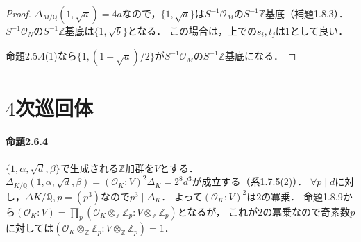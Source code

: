 \begin{proof}
  $\varDelta_{M/\mathbb{Q}}(1, \sqrt{a})=4a$なので，$\{1, \sqrt{a}\}$は$S^{-1}\mathcal{O}_M$の$S^{-1}\mathbb{Z}$基底（補題1.8.3）．
  $S^{-1}\mathcal{O}_N$の$S^{-1}\mathbb{Z}$基底は$\{1, \sqrt{b}\}$となる．
  この場合は，上での$s_i, t_j$は$1$として良い．

  命題2.5.4(1)なら$\{1, (1+\sqrt{a})/2\}$が$S^{-1}\mathcal{O}_M$の$S^{-1}\mathbb{Z}$基底になる．
\end{proof}

\section{$4$次巡回体}
\paragraph{命題2.6.4}
$\{1, \alpha, \sqrt{d}, \beta\}$で生成される$\mathbb{Z}$加群を$V$とする．
$\varDelta_{K/\mathbb{Q}}(1, \alpha, \sqrt{d}, \beta)=(\mathcal{O}_K:V)^2\varDelta_K=2^8d^3$が成立する（系1.7.5(2)）．
$\forall p\mid d$に対し，$\varDelta{K/\mathbb{Q}, p}=(p^3)$なので$p^3\mid\varDelta_K$．
よって$(\mathcal{O}_K:V)^2$は$2$の冪乗．
命題1.8.9から$(\mathcal{O}_K:V)=\prod_p(\mathcal{O}_K\otimes_\mathbb{Z}\mathbb{Z}_p:V\otimes_\mathbb{Z}\mathbb{Z}_p)$となるが，
これが$2$の冪乗なので奇素数$p$に対しては$(\mathcal{O}_K\otimes_\mathbb{Z}\mathbb{Z}_p:V\otimes_\mathbb{Z}\mathbb{Z}_p)=1$．

